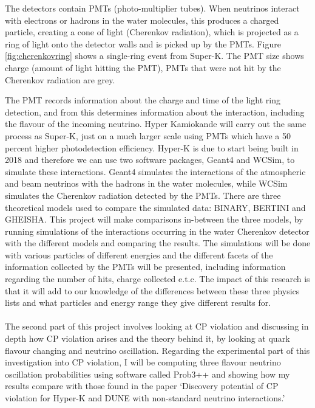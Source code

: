 \documentclass[11pt,oneside,a4paper]{article}
\begin{document}
The detectors contain PMTs (photo-multiplier tubes). When neutrinos interact with electrons or hadrons in the water molecules, this produces a charged particle, creating a cone of light (Cherenkov radiation), which is projected as a ring of light onto the detector walls and is picked up by the PMTs. Figure \ref{fig:cherenkovring} shows a single-ring event from Super-K. The PMT size shows charge (amount of light hitting the PMT), PMTs that were not hit by the Cherenkov radiation are grey.\par

The PMT records information about the charge and time of the light ring detection, and from this determines information about the interaction, including the flavour of the incoming neutrino. Hyper Kamiokande will carry out the same process as Super-K, just on a much larger scale using PMTs which have a 50 percent higher photodetection efficiency. Hyper-K is due to start being built in 2018 and therefore we can use two software packages, Geant4 and WCSim, to simulate these interactions. Geant4 simulates the interactions of the atmospheric and beam neutrinos with the hadrons in the water molecules, while WCSim simulates the Cherenkov radiation detected by the PMTs. There are three theoretical models used to compare the simulated data: BINARY, BERTINI and GHEISHA. This project will make comparisons in-between the three models, by running simulations of the interactions occurring in the water Cherenkov detector with the different models and comparing the results. The simulations will be done with various particles of different energies and the different facets of the information collected by the PMTs will be presented, including information regarding the number of hits, charge collected e.t.c. The impact of this research is that it will add to our knowledge of the differences between these three physics lists and what particles and energy range they give different results for. 
\paragraph{}
The second part of this project involves looking at CP violation and discussing in depth how CP violation arises and the theory behind it, by looking at quark flavour changing and neutrino oscillation. Regarding the experimental part of this investigation into CP violation, I will be computing three flavour neutrino oscillation probabilities using software called Prob3++ and showing how my results compare with those found in the paper `Discovery potential of CP violation for Hyper-K and DUNE with non-standard neutrino interactions.' \cite{yijiapaper}
\end{document}
